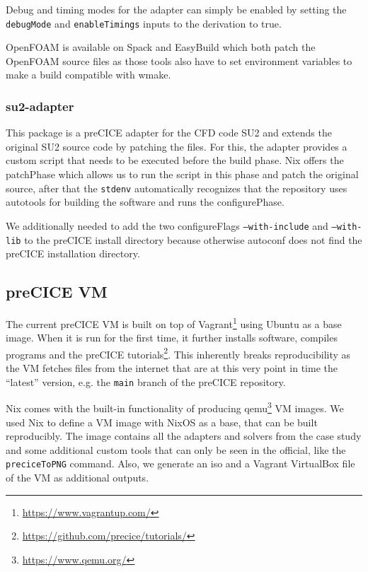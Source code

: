 \documentclass[conference,final,a4paper]{IEEEtran}
\begin{document}
Debug and timing modes for the adapter can simply be enabled by setting the \texttt{debugMode} and \texttt{enableTimings} inputs to the derivation to true.

OpenFOAM is available on Spack and EasyBuild which both patch the OpenFOAM source files as those tools also have to set environment variables to make a build compatible with wmake.\\

\subsubsection{su2-adapter}

This package is a preCICE adapter for the CFD code SU2 and extends the original SU2 source code by patching the files.
For this, the adapter provides a custom script that needs to be executed before the build phase.
Nix offers the patchPhase which allows us to run the script in this phase and patch the original source, after that the \texttt{stdenv} automatically recognizes that the repository uses autotools for building the software and runs the configurePhase.

We additionally needed to add the two configureFlags \texttt{--with-include} and \texttt{--with-lib} to the preCICE install directory because otherwise autoconf does not find the preCICE installation directory.

\subsection{preCICE VM}

The current preCICE VM is built on top of Vagrant\footnote{\url{https://www.vagrantup.com/}} using Ubuntu as a base image.
When it is run for the first time, it further installs software, compiles programs and the preCICE tutorials\footnote{\url{https://github.com/precice/tutorials/}}.
This inherently breaks reproducibility as the VM fetches files from the internet that are at this very point in time the ``latest'' version, e.g. the \texttt{main} branch of the preCICE repository.

Nix comes with the built-in functionality of producing qemu\footnote{\url{https://www.qemu.org/}} VM images.
We used Nix to define a VM image with NixOS as a base, that can be built reproducibly.
The image contains all the adapters and solvers from the case study and some additional custom tools that can only be seen in the official, like the \texttt{preciceToPNG} command.
Also, we generate an iso and a Vagrant VirtualBox file of the VM as additional outputs.
\end{document}

